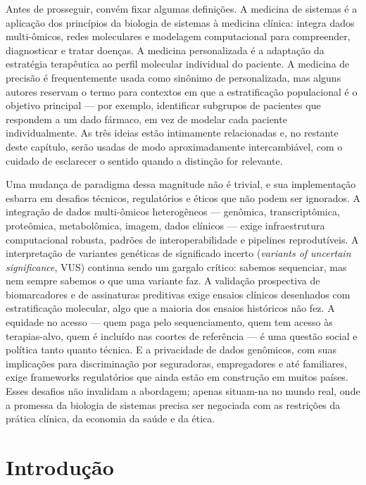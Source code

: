 Antes de prosseguir, convém fixar algumas definições. A medicina de sistemas é a aplicação dos princípios da biologia de sistemas à medicina clínica: integra dados multi-ômicos, redes moleculares e modelagem computacional para compreender, diagnosticar e tratar doenças. A medicina personalizada é a adaptação da estratégia terapêutica ao perfil molecular individual do paciente. A medicina de precisão é frequentemente usada como sinônimo de personalizada, mas alguns autores reservam o termo para contextos em que a estratificação populacional é o objetivo principal --- por exemplo, identificar subgrupos de pacientes que respondem a um dado fármaco, em vez de modelar cada paciente individualmente. As três ideias estão intimamente relacionadas e, no restante deste capítulo, serão usadas de modo aproximadamente intercambiável, com o cuidado de esclarecer o sentido quando a distinção for relevante.

Uma mudança de paradigma dessa magnitude não é trivial, e sua implementação esbarra em desafios técnicos, regulatórios e éticos que não podem ser ignorados. A integração de dados multi-ômicos heterogêneos --- genômica, transcriptômica, proteômica, metabolômica, imagem, dados clínicos --- exige infraestrutura computacional robusta, padrões de interoperabilidade e pipelines reprodutíveis. A interpretação de variantes genéticas de significado incerto (\emph{variants of uncertain significance}, VUS) continua sendo um gargalo crítico: sabemos sequenciar, mas nem sempre sabemos o que uma variante faz. A validação prospectiva de biomarcadores e de assinaturas preditivas exige ensaios clínicos desenhados com estratificação molecular, algo que a maioria dos ensaios históricos não fez. A equidade no acesso --- quem paga pelo sequenciamento, quem tem acesso às terapias-alvo, quem é incluído nas coortes de referência --- é uma questão social e política tanto quanto técnica. E a privacidade de dados genômicos, com suas implicações para discriminação por seguradoras, empregadores e até familiares, exige frameworks regulatórios que ainda estão em construção em muitos países. Esses desafios não invalidam a abordagem; apenas situam-na no mundo real, onde a promessa da biologia de sistemas precisa ser negociada com as restrições da prática clínica, da economia da saúde e da ética.

\section{Introdução}
\label{sec:13-introducao}

